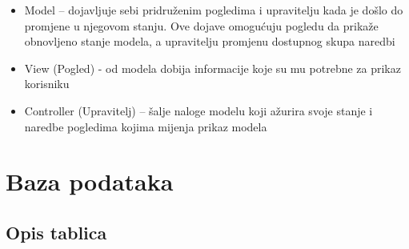 \begin{itemize}
\item Model – dojavljuje sebi pridruženim pogledima i upravitelju kada je došlo do promjene u njegovom stanju. Ove dojave omogućuju pogledu da prikaže obnovljeno stanje modela, a upravitelju promjenu dostupnog skupa naredbi
\item View (Pogled) - od modela dobija informacije koje su mu potrebne za prikaz korisniku
\item Controller (Upravitelj)  – šalje naloge modelu koji ažurira svoje stanje i naredbe pogledima kojima mijenja prikaz modela
\end{itemize}
		

				
		\section{Baza podataka}
			
			
		
			\subsection{Opis tablica}
			

				
				
				
